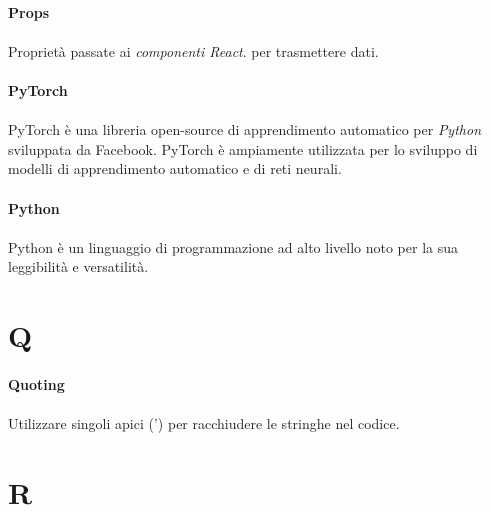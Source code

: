 \documentclass[10pt, a4paper]{article}
\begin{document}
\vspace{2em}
\paragraph{Props}\noindent\hrulefill
\paragraph{}Proprietà passate ai \textit{componenti React\pg}. per trasmettere dati.

\vspace{2em}
\paragraph{PyTorch}\noindent\hrulefill
\paragraph{}PyTorch è una libreria open-source di apprendimento automatico per \textit{Python\pg} sviluppata da Facebook. PyTorch è ampiamente utilizzata per lo sviluppo di modelli di apprendimento automatico e di reti neurali.

\vspace{2em}
\paragraph{Python}\noindent\hrulefill
\paragraph{}Python è un linguaggio di programmazione ad alto livello noto per la sua leggibilità e versatilità.


\newpage
\section{Q}
\vspace{2em}
\paragraph{Quoting}\noindent\hrulefill
\paragraph{}Utilizzare singoli apici (') per racchiudere le stringhe nel codice.


\newpage
\section{R}
\vspace{2em}
\end{document}
